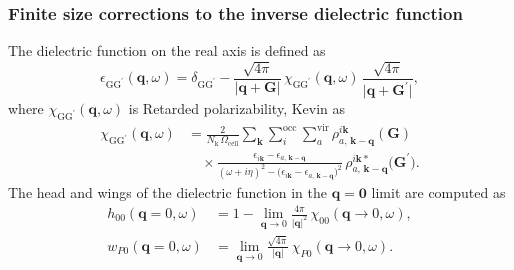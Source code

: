 \subsubsection{Finite size corrections to the inverse dielectric function }

The dielectric function on the real axis is defined as
\begin{equation}
    \epsilon_{\mathrm{GG}^{\prime}}(\mathbf{q}, \omega)
    = \delta_{\mathrm{GG}^{\prime}}
      - \frac{\sqrt{4\pi}}{\lvert\mathbf{q}+\mathbf{G}\rvert}\,
        \chi_{\mathrm{GG}^{\prime}}(\mathbf{q}, \omega)\,
        \frac{\sqrt{4\pi}}{\lvert\mathbf{q}+\mathbf{G}^{\prime}\rvert},
    \tag{41R}
\end{equation}
where $\chi_{\mathrm{GG}^{\prime}}(\mathbf{q}, \omega)$ is Retarded polarizability, Kevin as
\begin{align}
\chi_{\mathrm{GG}^{\prime}}(\mathbf{q}, \omega)
  &= \frac{2}{N_{\mathrm{k}}\,\Omega_{\mathrm{cell}}}
     \sum_{\mathbf{k}}
     \sum_i^{\mathrm{occ}}
     \sum_a^{\mathrm{vir}}
     \rho_{a,\,\mathbf{k}-\mathbf{q}}^{i\mathbf{k}}(\mathbf{G})
     \nonumber \\
  &\quad \times
     \frac{\epsilon_{i\mathbf{k}}-\epsilon_{a,\,\mathbf{k}-\mathbf{q}}}
          {(\omega + i\eta)^2
           - \bigl(\epsilon_{i\mathbf{k}}
                   - \epsilon_{a,\,\mathbf{k}-\mathbf{q}}\bigr)^2}\,
     \rho_{a,\,\mathbf{k}-\mathbf{q}}^{i\mathbf{k} *}
       \bigl(\mathbf{G}^{\prime}\bigr).
  \tag{42R'}
\end{align} The head and wings of the dielectric function in the
$\mathbf{q}=\mathbf{0}$ limit are computed as
\begin{align}
    h_{00}(\mathbf{q}=0, \omega)
    &= 1 - \lim_{\mathbf{q} \rightarrow 0}
          \frac{4 \pi}{\lvert\mathbf{q}\rvert^2}\,
          \chi_{00}(\mathbf{q} \rightarrow 0, \omega), \tag{47} \\
  w_{P0}(\mathbf{q}=0, \omega)
    &= \lim_{\mathbf{q} \rightarrow 0}
       \frac{\sqrt{4 \pi}}{\lvert\mathbf{q}\rvert}\,
       \chi_{P0}(\mathbf{q} \rightarrow 0, \omega).
       \tag{48}
\end{align}
